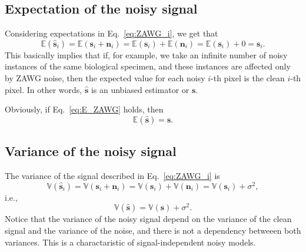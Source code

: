 \subsection{Expectation of the noisy signal}
Considering expectations in Eq.~\ref{eq:ZAWG_i}, we get that
\begin{equation}
  \mathbb{E}(\hat{\mathbf{s}}_i) = \mathbb{E}(\mathbf{s}_i + \mathbf{n}_i) = \mathbb{E}(\mathbf{s}_i) + \mathbb{E}(\mathbf{n}_i) = \mathbb{E}(\mathbf{s}_i) + 0 = \mathbf{s}_i.
  \label{eq:E_ZAWG_i}
\end{equation}
This basically implies that if, for example, we take an infinite
number of noisy instances of the same biological specimen, and these
instances are affected only by ZAWG noise, then the expected value for each
noisy $i$-th pixel is the clean $i$-th pixel. In other words,
$\hat{\mathbf{s}}$ is an unbiased estimator or $\mathbf{s}$.

Obviously, if Eq.~\ref{eq:E_ZAWG} holds, then
\begin{equation}
  \mathbb{E}(\hat{\mathbf{s}}) = \mathbf{s}.
  \label{eq:E_ZAWG}
\end{equation}

\begin{comment}
Considering that $\mathbf{s}$ is a constant (the
clean image is fixed for each adquisition of the image $\hat{\mathbf{s}}$),
\begin{equation}
  \mathbb{E}(\hat{\mathbf{s}}) = \mathbb{E}(\mathbf{s} + \mathbf{n}) = \mathbb{E}(\mathbf{s}) + \mathbb{E}(\mathbf{n}) = \mathbf{s} + \mathbf{0} = \mathbf{s}.
  \label{eq:E_ZAWG}
\end{equation}
\end{comment}

\subsection{Variance of the noisy signal}
The variance of the signal described in Eq.~\ref{eq:ZAWG_i} is
\begin{equation}
  \mathbb{V}(\hat{\mathbf{s}}_i) = \mathbb{V}(\mathbf{s}_i + \mathbf{n}_i) = \mathbb{V}(\mathbf{s}_i) + \mathbb{V}(\mathbf{n}_i) = \mathbb{V}(\mathbf{s}_i) + \sigma^2,
  \label{eq:V_ZAWG_i}
\end{equation}
i.e.,
\begin{equation}
  \mathbb{V}(\hat{\mathbf{s}}) = \mathbb{V}(\mathbf{s}) + \sigma^2.
  \label{eq:V_ZAWG}
\end{equation}
Notice that the variance of the noisy signal depend on the variance of
the clean signal and the variance of the noise, and there is not a
dependency betweeen both variances. This is a
charactaristic of signal-independent noisy models.

